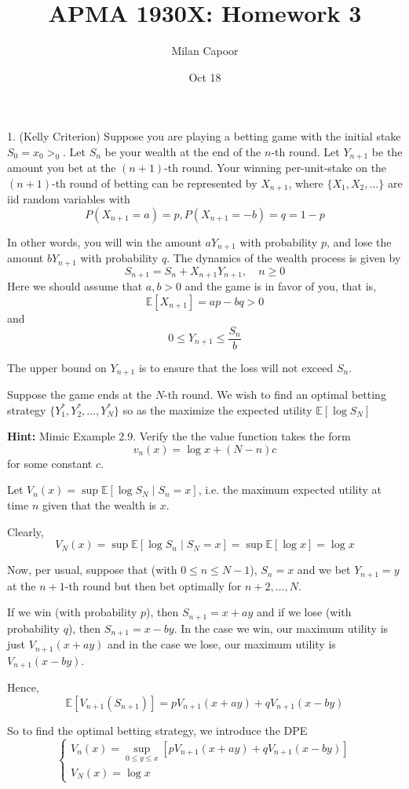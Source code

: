 \documentclass[12pt]{article}
\title{APMA 1930X: Homework 3}
\author{Milan Capoor}
\date{Oct 18}
\newcommand{\E}{\mathbb{E}}
\newcommand*{\tbf}[1]{\ifmmode\mathbf{#1}\else\textbf{#1}\fi}
\begin{document}
\maketitle

1. (Kelly Criterion)  Suppose you are playing a betting game with the initial stake $S_0 = x_0 > _0$. Let $S_n$ be your wealth at the end of the $n$-th round. Let $Y_{n+1}$ be the amount you bet at the $(n + 1)$-th round. Your winning per-unit-stake on the $(n + 1)$-th round of betting can be represented by $X_{n+1}$, where $\{X_1, X_2, \dots\}$ are iid random  variables with
\[P(X_{n+1} = a) = p, P(X_{n+1} = -b) = q = 1 - p\]

In other words, you will win the amount $aY_{n+1}$ with probability $p$, and lose the amount $bY_{n+1}$ with probability $q$. The dynamics of the wealth process is given by
\[S_{n+1} = S_n + X_{n+1} Y_{n+1},\quad n \geq 0\]
Here we should assume that $a, b > 0$ and the game is in favor of you,
that is,
\[\E[X_{n+1}] = ap - bq > 0\]
and
\[0 \leq Y_{n+1} \leq \frac{S_n}{b}\]

The upper bound on $Y_{n+1}$ is to ensure that the loss will not exceed $S_n$.

Suppose the game ends at the $N$-th round. We wish to find an optimal betting strategy $\{Y_1^*, Y_2^*, \dots, Y_{N}^*\}$ so as the maximize the expected utility $\E[\log S_N]$

\tbf{Hint:} Mimic Example 2.9. Verify the the value function takes the form 
\[v_n(x) = \log x + (N - n)c\]
for some constant $c$. 

    \color{blue}
        Let $V_n(x) = \sup \E[\log S_N \; | \; S_n = x]$, i.e. the maximum expected utility at time $n$ given that the wealth is $x$. 

        Clearly, 
        \[V_N(x) = \sup \E[\log S_n \; | \; S_N = x] = \sup \E[\log x] = \log x\]

        Now, per usual, suppose that (with $0 \leq n \leq N - 1$), $S_n = x$ and we bet $Y_{n+1} = y$ at the $n+1$-th round but then bet optimally for $n+2, \dots, N$.

        If we win (with probability $p$), then $S_{n+1} = x + ay$ and if we lose (with probability $q$), then $S_{n+1} = x - by$. In the case we win, our maximum utility is just $V_{n+1}(x + ay)$ and in the case we lose, our maximum utility is $V_{n+1}(x - by)$.

        Hence, 
        \[\E[V_{n+1}(S_{n+1})] = pV_{n+1}(x + ay) + qV_{n+1}(x - by)\]

        So to find the optimal betting strategy, we introduce the DPE 
        \[\begin{cases}
            V_n(x) = \sup_{0 \leq y \leq x} [pV_{n+1}(x + ay) + qV_{n+1}(x - by)]\\ 
            V_N(x) = \log x
        \end{cases}\]
\end{document}
